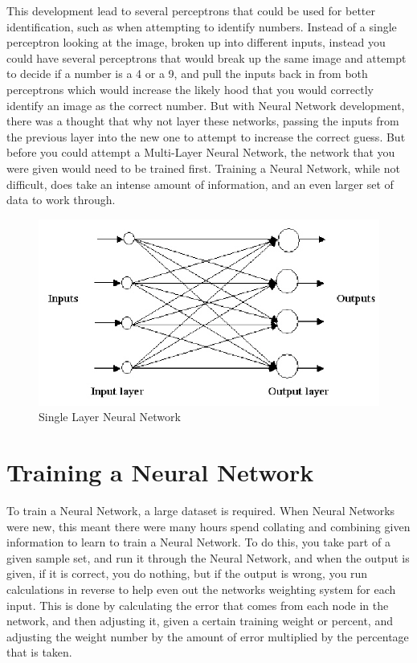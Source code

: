 \documentclass{article}
\begin{document}
 This development lead to several perceptrons that could be used for better identification, such as when attempting to identify numbers. Instead of a single perceptron looking at the image, broken up into different inputs, instead you could have several perceptrons that would break up the same image and attempt to decide if a number is a 4 or a 9, and pull the inputs back in from both perceptrons which would increase the likely hood that you would correctly identify an image as the correct number.
But with Neural Network development, there was a thought that why not layer these networks, passing the inputs from the previous layer into the new one to attempt to increase the correct guess. But before you could attempt a Multi-Layer Neural Network, the network that you were given would need to be trained first. Training a Neural Network, while not difficult, does take an intense amount of information, and an even larger set of data to work through.


\begin{figure}[h]
  \centering
  \includegraphics[width=\textwidth]{pics/single_layer.png}
  \caption{Single Layer Neural Network}
\end{figure}



\section{Training a Neural Network}
To train a Neural Network, a large dataset is required. When Neural Networks were new, this meant there were many hours spend collating and combining given information to learn to train a Neural Network. To do this, you take part of a given sample set, and run it through the Neural Network, and when the output is given, if it is correct, you do nothing, but if the output is wrong, you run calculations in reverse to help even out the networks weighting system for each input. This is done by calculating the error that comes from each node in the network, and then adjusting it, given a certain training weight or percent, and adjusting the weight number by the amount of error multiplied by the percentage that is taken.
\end{document}
